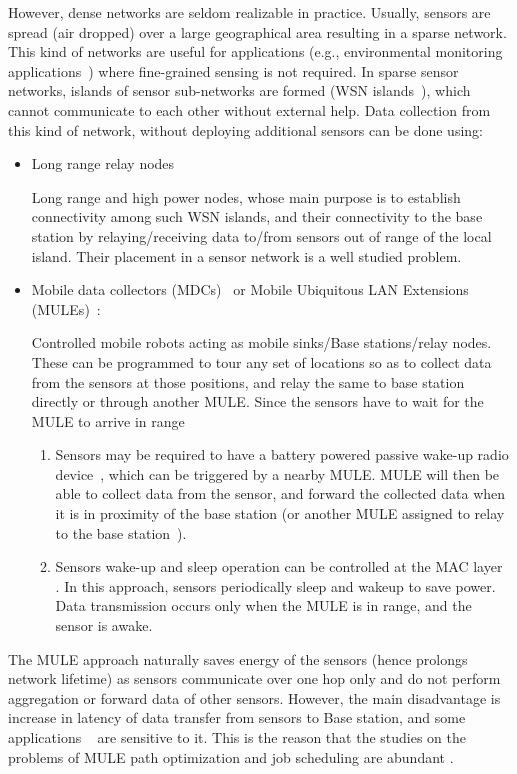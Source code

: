However, dense networks are seldom realizable in practice. Usually, sensors are spread (air dropped) over a large geographical area resulting in a sparse network. This kind of networks are useful for applications (e.g., environmental monitoring applications~\cite{sparseEx}) where fine-grained sensing is not required. In sparse sensor networks, islands of sensor sub-networks are formed (WSN islands~\cite{intro2}), which cannot communicate to each other without external help. Data collection from this kind of network, without deploying additional sensors can be done using:
\begin{itemize}
\item Long range relay nodes~\cite{relayNodes}
  
Long range and high power nodes, whose main purpose is to establish connectivity among such WSN islands, and their connectivity to the base station by relaying/receiving data to/from sensors out of range of the local island. Their placement in a sensor network is a well studied problem.
\item Mobile data collectors (MDCs)~\cite{intro3} or Mobile Ubiquitous LAN Extensions (MULEs)~\cite{intro1}: 
  
Controlled mobile robots acting as mobile sinks/Base stations/relay nodes. These can be programmed to tour any set of locations so as to collect data from the sensors at those positions, and relay the same to base station directly or through another MULE. Since the sensors have to wait for the MULE to arrive in range
\begin{enumerate}
\item Sensors may be required to have a battery powered passive wake-up radio device~\cite{intro4}, which can be triggered by a nearby MULE. MULE will then be able to collect data from the sensor, and forward the collected data 
when it is in proximity of the base station (or another MULE assigned to relay to the base station~\cite{sim2}). %

\item Sensors wake-up and sleep operation can be controlled at the MAC layer~\cite{dutyCycle1} \cite{dutyCycle2}. In this approach, sensors periodically sleep and wakeup to save power. Data transmission occurs only when the MULE is in range, and the sensor is awake.
\end{enumerate}
\end{itemize}

The MULE approach naturally saves energy of the sensors (hence prolongs network lifetime) as sensors communicate over one hop only and do not perform aggregation or forward data of other sensors. However, the main disadvantage is increase in latency of data transfer from sensors to Base station, and some applications ~\cite{application4} are sensitive to it. This is the reason that the studies on the problems of MULE path optimization and job scheduling are abundant \cite{muleSurvey}.

